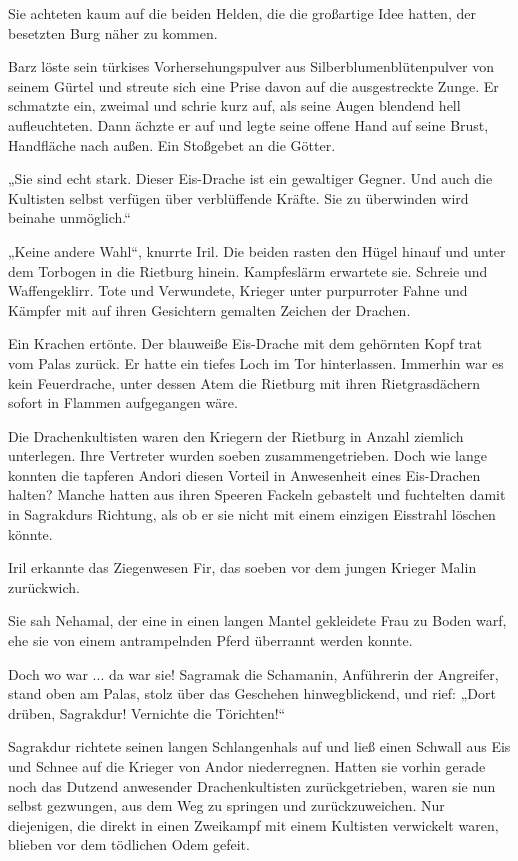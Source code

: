 Sie achteten kaum auf die beiden Helden, die die großartige Idee hatten, der besetzten Burg näher zu kommen.

Barz löste sein türkises Vorhersehungspulver aus Silberblumenblütenpulver von seinem Gürtel und streute sich eine Prise davon auf die ausgestreckte Zunge. Er schmatzte ein, zweimal und schrie kurz auf, als seine Augen blendend hell aufleuchteten. Dann ächzte er auf und legte seine offene Hand auf seine Brust, Handfläche nach außen. Ein Stoßgebet an die Götter.

„Sie sind echt stark. Dieser Eis-Drache ist ein gewaltiger Gegner. Und auch die Kultisten selbst verfügen über verblüffende Kräfte. Sie zu überwinden wird beinahe unmöglich.“

„Keine andere Wahl“, knurrte Iril. Die beiden rasten den Hügel hinauf und unter dem Torbogen in die Rietburg hinein. Kampfeslärm erwartete sie. Schreie und Waffengeklirr. Tote und Verwundete, Krieger unter purpurroter Fahne und Kämpfer mit auf ihren Gesichtern gemalten Zeichen der Drachen.

Ein Krachen ertönte. Der blauweiße Eis-Drache mit dem gehörnten Kopf trat vom Palas zurück. Er hatte ein tiefes Loch im Tor hinterlassen. Immerhin war es kein Feuerdrache, unter dessen Atem die Rietburg mit ihren Rietgrasdächern sofort in Flammen aufgegangen wäre.

Die Drachenkultisten waren den Kriegern der Rietburg in Anzahl ziemlich unterlegen. Ihre Vertreter wurden soeben zusammengetrieben. Doch wie lange konnten die tapferen Andori diesen Vorteil in Anwesenheit eines Eis-Drachen halten? Manche hatten aus ihren Speeren Fackeln gebastelt und fuchtelten damit in Sagrakdurs Richtung, als ob er sie nicht mit einem einzigen Eisstrahl löschen könnte.

Iril erkannte das Ziegenwesen Fir, das soeben vor dem jungen Krieger Malin zurückwich.

Sie sah Nehamal, der eine in einen langen Mantel gekleidete Frau zu Boden warf, ehe sie von einem antrampelnden Pferd überrannt werden konnte.

Doch wo war ... da war sie! Sagramak die Schamanin, Anführerin der Angreifer, stand oben am Palas, stolz über das Geschehen hinwegblickend, und rief: „Dort drüben, Sagrakdur! Vernichte die Törichten!“

Sagrakdur richtete seinen langen Schlangenhals auf und ließ einen Schwall aus Eis und Schnee auf die Krieger von Andor niederregnen. Hatten sie vorhin gerade noch das Dutzend anwesender Drachenkultisten zurückgetrieben, waren sie nun selbst gezwungen, aus dem Weg zu springen und zurückzuweichen. Nur diejenigen, die direkt in einen Zweikampf mit einem Kultisten verwickelt waren, blieben vor dem tödlichen Odem gefeit.

